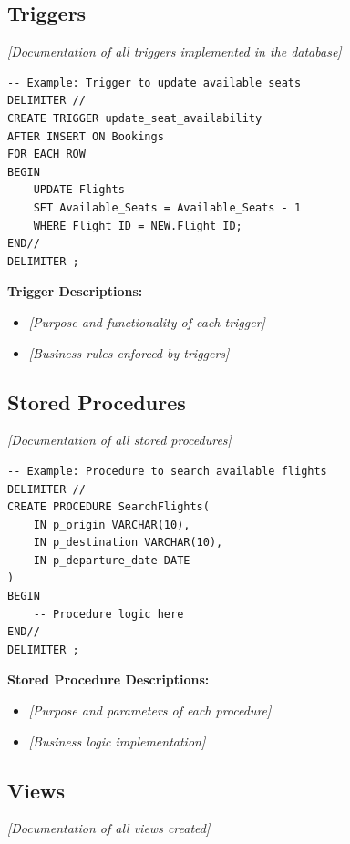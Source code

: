 \documentclass[12pt,a4paper,openany]{report}
\begin{document}
\subsection{Triggers}

\textit{[Documentation of all triggers implemented in the database]}

\begin{lstlisting}[caption={Sample Trigger - Seat Availability}]
-- Example: Trigger to update available seats
DELIMITER //
CREATE TRIGGER update_seat_availability
AFTER INSERT ON Bookings
FOR EACH ROW
BEGIN
    UPDATE Flights
    SET Available_Seats = Available_Seats - 1
    WHERE Flight_ID = NEW.Flight_ID;
END//
DELIMITER ;
\end{lstlisting}

\textbf{Trigger Descriptions:}
\begin{itemize}
    \item \textit{[Purpose and functionality of each trigger]}
    \item \textit{[Business rules enforced by triggers]}
\end{itemize}

\subsection{Stored Procedures}

\textit{[Documentation of all stored procedures]}

\begin{lstlisting}[caption={Sample Stored Procedure - Flight Search}]
-- Example: Procedure to search available flights
DELIMITER //
CREATE PROCEDURE SearchFlights(
    IN p_origin VARCHAR(10),
    IN p_destination VARCHAR(10),
    IN p_departure_date DATE
)
BEGIN
    -- Procedure logic here
END//
DELIMITER ;
\end{lstlisting}

\textbf{Stored Procedure Descriptions:}
\begin{itemize}
    \item \textit{[Purpose and parameters of each procedure]}
    \item \textit{[Business logic implementation]}
\end{itemize}

\subsection{Views}

\textit{[Documentation of all views created]}
\end{document}
